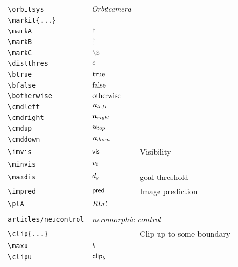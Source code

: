 \begin{longtable}{lll}
 {\color[rgb]{0.5,0.5,0.5}\texttt{\textbackslash orbitsys}} & $Orbit camera$ & \\ 
 {\color[rgb]{0.5,0.5,0.5}\texttt{\textbackslash markit\{...\}}} &  & \\ 
 {\color[rgb]{0.5,0.5,0.5}\texttt{\textbackslash markA}} & $\markA$ & \\ 
 {\color[rgb]{0.5,0.5,0.5}\texttt{\textbackslash markB}} & $\markB$ & \\ 
 {\color[rgb]{0.5,0.5,0.5}\texttt{\textbackslash markC}} & $\markC$ & \\ 
 {\color[rgb]{0.5,0.5,0.5}\texttt{\textbackslash distthres}} & $c$ & \\ 
 {\color[rgb]{0.5,0.5,0.5}\texttt{\textbackslash btrue}} & $\text{true}$ & \\ 
 {\color[rgb]{0.5,0.5,0.5}\texttt{\textbackslash bfalse}} & $\text{false}$ & \\ 
 {\color[rgb]{0.5,0.5,0.5}\texttt{\textbackslash botherwise}} & $\text{otherwise}$ & \\ 
 {\color[rgb]{0.5,0.5,0.5}\texttt{\textbackslash cmdleft}} & $\boldsymbol{u}_{left}$ & \\ 
 {\color[rgb]{0.5,0.5,0.5}\texttt{\textbackslash cmdright}} & $\boldsymbol{u}_{right}$ & \\ 
 {\color[rgb]{0.5,0.5,0.5}\texttt{\textbackslash cmdup}} & $\boldsymbol{u}_{top}$ & \\ 
 {\color[rgb]{0.5,0.5,0.5}\texttt{\textbackslash cmddown}} & $\boldsymbol{u}_{down}$ & \\ 
 {\color[rgb]{0.5,0.5,0.5}\texttt{\textbackslash imvis}} & $\mathsf{vis}$ &  Visibility\\ 
 {\color[rgb]{0.5,0.5,0.5}\texttt{\textbackslash minvis}} & $v_0$ & \\ 
 {\color[rgb]{0.5,0.5,0.5}\texttt{\textbackslash maxdis}} & $d_g$ &  goal threshold\\ 
 {\color[rgb]{0.5,0.5,0.5}\texttt{\textbackslash impred}} & $\mathsf{pred}$ &  Image prediction\\ 
 {\color[rgb]{0.5,0.5,0.5}\texttt{\textbackslash plA}} & $RLrl$ & \\ 
  &  & \\ 
 {\color[rgb]{0.5,0.5,0.5}\texttt{articles/neucontrol}} & \multicolumn{2}{l}{\emph{neromorphic control}}\\ 
 \hline
{\color[rgb]{0.5,0.5,0.5}\texttt{\textbackslash clip\{...\}}} &  &  Clip up to some boundary \\ 
 {\color[rgb]{0.5,0.5,0.5}\texttt{\textbackslash maxu}} & $b$ & \\ 
 {\color[rgb]{0.5,0.5,0.5}\texttt{\textbackslash clipu}} & $\mathsf{clip}_{b}$ & \\ 

\end{longtable}
